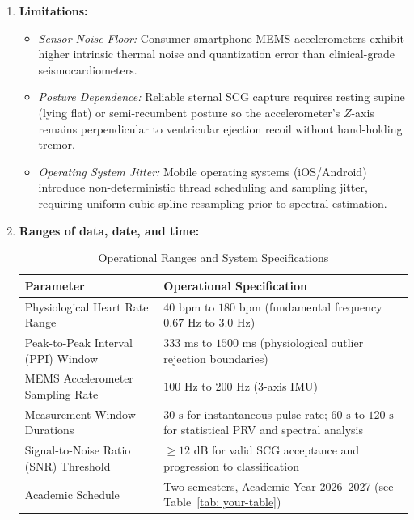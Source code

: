 \begin{enumerate}
	\item \textbf{Limitations:}
	\begin{itemize}
		\item \textit{Sensor Noise Floor:} Consumer smartphone MEMS accelerometers exhibit higher intrinsic thermal noise and quantization error than clinical-grade seismocardiometers.
		\item \textit{Posture Dependence:} Reliable sternal SCG capture requires resting supine (lying flat) or semi-recumbent posture so the accelerometer's $Z$-axis remains perpendicular to ventricular ejection recoil without hand-holding tremor.
		\item \textit{Operating System Jitter:} Mobile operating systems (iOS/Android) introduce non-deterministic thread scheduling and sampling jitter, requiring uniform cubic-spline resampling prior to spectral estimation.
	\end{itemize}
	
	\item \textbf{Ranges of data, date, and time:}
	\begin{table}[!ht]
		\footnotesize
		\centering
		\caption{Operational Ranges and System Specifications}
		\label{tab:system_ranges}
		\begin{tabular}{|p{4.2cm}|p{8.8cm}|}
			\hline
			\textbf{Parameter} & \textbf{Operational Specification} \\ \hline
			Physiological Heart Rate Range & $40\text{ bpm}$ to $180\text{ bpm}$ (fundamental frequency $0.67\text{ Hz}$ to $3.0\text{ Hz}$) \\ \hline
			Peak-to-Peak Interval (PPI) Window & $333\text{ ms}$ to $1500\text{ ms}$ (physiological outlier rejection boundaries) \\ \hline
			MEMS Accelerometer Sampling Rate & $100\text{ Hz}$ to $200\text{ Hz}$ (3-axis IMU) \\ \hline
			Measurement Window Durations & $30\text{ s}$ for instantaneous pulse rate; $60\text{ s}$ to $120\text{ s}$ for statistical PRV and spectral analysis \\ \hline
			Signal-to-Noise Ratio (SNR) Threshold & $\ge 12\text{ dB}$ for valid SCG acceptance and progression to classification \\ \hline
			Academic Schedule & Two semesters, Academic Year 2026--2027 (see Table~\ref{tab: your-table}) \\ \hline
		\end{tabular}
	\end{table}
	

\end{enumerate}
